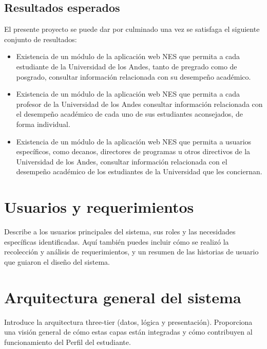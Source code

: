 \subsection{Resultados esperados}

El presente proyecto se puede dar por culminado una vez se satisfaga el siguiente conjunto de resultados:
\begin{itemize}
	\item Existencia de un módulo de la aplicación web \gls{NES} que permita a cada estudiante de la Universidad de los Andes, tanto de pregrado como de posgrado, consultar información relacionada con su desempeño académico.
	\item Existencia de un módulo de la aplicación web \gls{NES} que permita a cada profesor de la Universidad de los Andes consultar información relacionada con el desempeño académico de cada uno de sus estudiantes aconsejados, de forma individual.
	\item Existencia de un módulo de la aplicación web \gls{NES} que permita a usuarios específicos, como decanos, directores de programas u otros directivos de la Universidad de los Andes, consultar información relacionada con el desempeño académico de los estudiantes de la Universidad que les conciernan.
\end{itemize}

\section{Usuarios y requerimientos}
Describe a los usuarios principales del sistema, sus roles y las necesidades específicas identificadas. Aquí también puedes incluir cómo se realizó la recolección y análisis de requerimientos, y un resumen de las historias de usuario que guiaron el diseño del sistema.

\section{Arquitectura general del sistema}
Introduce la arquitectura three-tier (datos, lógica y presentación). Proporciona una visión general de cómo estas capas están integradas y cómo contribuyen al funcionamiento del Perfil del estudiante.